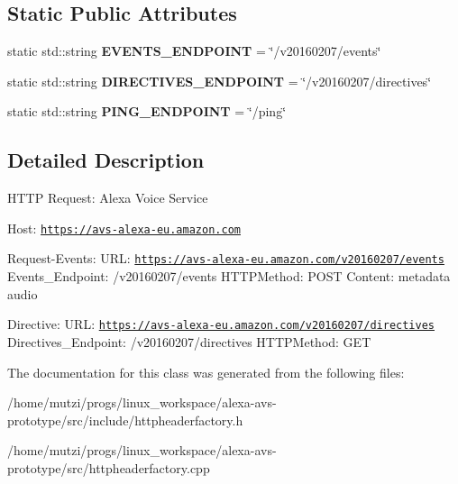 \subsection*{Static Public Attributes}
\begin{DoxyCompactItemize}
\item 
\mbox{\label{classNetwork_1_1HTTP_1_1HTTPHeaderFactory_a9c2717b2b2a9e14f5bfaefe2f2942528}} 
static std\+::string {\bfseries E\+V\+E\+N\+T\+S\+\_\+\+E\+N\+D\+P\+O\+I\+NT} = \char`\"{}/v20160207/events\char`\"{}
\item 
\mbox{\label{classNetwork_1_1HTTP_1_1HTTPHeaderFactory_afc245df4d2b4a8a9b3679d38eec1435f}} 
static std\+::string {\bfseries D\+I\+R\+E\+C\+T\+I\+V\+E\+S\+\_\+\+E\+N\+D\+P\+O\+I\+NT} = \char`\"{}/v20160207/directives\char`\"{}
\item 
\mbox{\label{classNetwork_1_1HTTP_1_1HTTPHeaderFactory_ac2bd55cf0bd7880c321aa0bde414a7e1}} 
static std\+::string {\bfseries P\+I\+N\+G\+\_\+\+E\+N\+D\+P\+O\+I\+NT} = \char`\"{}/ping\char`\"{}
\end{DoxyCompactItemize}


\subsection{Detailed Description}
H\+T\+TP Request\+: Alexa Voice Service

Host\+: \href{https://avs-alexa-eu.amazon.com}{\tt https\+://avs-\/alexa-\/eu.\+amazon.\+com}

Request-\/\+Events\+: U\+RL\+: \href{https://avs-alexa-eu.amazon.com/v20160207/events}{\tt https\+://avs-\/alexa-\/eu.\+amazon.\+com/v20160207/events} Events\+\_\+\+Endpoint\+: /v20160207/events H\+T\+T\+P\+Method\+: P\+O\+ST Content\+: metadata audio

Directive\+: U\+RL\+: \href{https://avs-alexa-eu.amazon.com/v20160207/directives}{\tt https\+://avs-\/alexa-\/eu.\+amazon.\+com/v20160207/directives} Directives\+\_\+\+Endpoint\+: /v20160207/directives H\+T\+T\+P\+Method\+: G\+ET 

The documentation for this class was generated from the following files\+:\begin{DoxyCompactItemize}
\item 
/home/mutzi/progs/linux\+\_\+workspace/alexa-\/avs-\/prototype/src/include/httpheaderfactory.\+h\item 
/home/mutzi/progs/linux\+\_\+workspace/alexa-\/avs-\/prototype/src/httpheaderfactory.\+cpp\end{DoxyCompactItemize}
